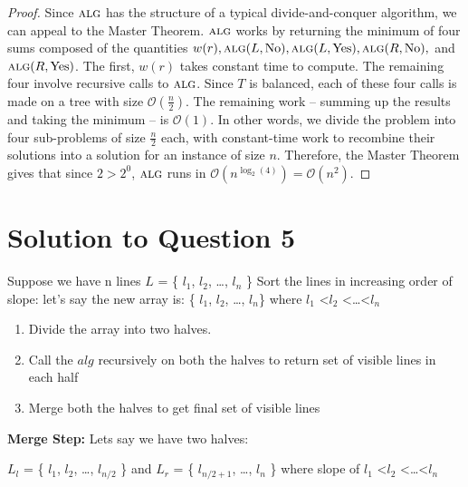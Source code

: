 \documentclass[11pt]{article}
\renewcommand{\O}{\mathcal{O}}
\newcommand{\alg}{\textsc{alg}}
\begin{document}
\begin{proof}
  Since $\alg$ has the structure of a typical divide-and-conquer algorithm, we can appeal to the Master Theorem.
  $\alg$ works by returning the minimum of four sums composed of the quantities $w(r), \alg(L, \operatorname{No}), \alg(L, \operatorname{Yes}), \alg(R, \operatorname{No}),$ and $\alg(R, \operatorname{Yes})$.
  The first, $w(r)$ takes constant time to compute.
  The remaining four involve recursive calls to $\alg$.
  Since $T$ is balanced, each of these four calls is made on a tree with size $\O(\frac{n}{2})$.
  The remaining work -- summing up the results and taking the minimum -- is $\O(1)$.
  In other words, we divide the problem into four sub-problems of size $\frac{n}{2}$ each, with constant-time work to recombine their solutions into a solution for an instance of size $n$.
  Therefore, the Master Theorem gives that since $2 > 2^0$, $\alg$ runs in $\O(n^{\log_{2}(4)}) = \O(n^2)$.
\end{proof}

\section{Solution to Question 5}

Suppose we have n lines $L$ = \{ $l_1$, $l_2$, \dots, $l_n$ \} \newline
Sort the lines in increasing order of slope: \newline
let's say the new array is: \{ $l_1$, $l_2$, \dots , $l_n$\} where $l_1$ \textless $l_2$ \textless \dots \textless $l_n$ \newline
\begin{enumerate}
\item Divide the array into two halves. \newline
\item Call the $alg$ recursively on both the halves to return set of visible lines in each half \newline
\item Merge both the halves to get final set of visible lines \newline
\end{enumerate}
{\bf Merge Step:} \newline
Lets say we have two halves: \newline

$L_l$ = \{ $l_1$, $l_2$, \dots, $l_{n/2}$ \}  and $L_r$ = \{ $l_{n/2+1}$, \dots, $l_n$ \}  \newline
where slope of $l_1$ \textless $l_2$ \textless \dots \textless $l_n$
\end{document}
